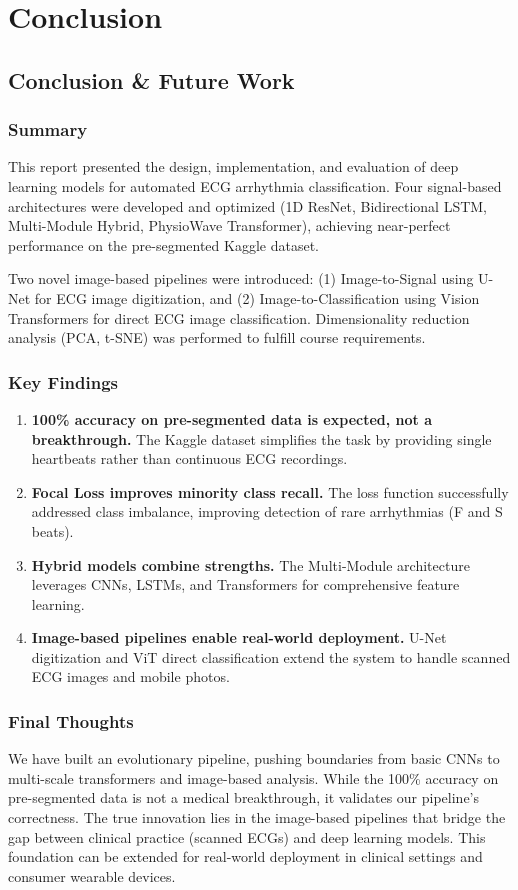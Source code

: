 \part{Conclusion}

\chapter{Conclusion \& Future Work}
\label{chap:conclusion}

\section{Summary}
This report presented the design, implementation, and evaluation of deep learning models for automated ECG arrhythmia classification. Four signal-based architectures were developed and optimized (1D ResNet, Bidirectional LSTM, Multi-Module Hybrid, PhysioWave Transformer), achieving near-perfect performance on the pre-segmented Kaggle dataset.

Two novel image-based pipelines were introduced: (1) Image-to-Signal using U-Net for ECG image digitization, and (2) Image-to-Classification using Vision Transformers for direct ECG image classification. Dimensionality reduction analysis (PCA, t-SNE) was performed to fulfill course requirements.

\section{Key Findings}
\begin{enumerate}
    \item \textbf{100\% accuracy on pre-segmented data is expected, not a breakthrough.} The Kaggle dataset simplifies the task by providing single heartbeats rather than continuous ECG recordings.
    \item \textbf{Focal Loss improves minority class recall.} The loss function successfully addressed class imbalance, improving detection of rare arrhythmias (F and S beats).
    \item \textbf{Hybrid models combine strengths.} The Multi-Module architecture leverages CNNs, LSTMs, and Transformers for comprehensive feature learning.
    \item \textbf{Image-based pipelines enable real-world deployment.} U-Net digitization and ViT direct classification extend the system to handle scanned ECG images and mobile photos.
\end{enumerate}

\section{Final Thoughts}
We have built an evolutionary pipeline, pushing boundaries from basic CNNs to multi-scale transformers and image-based analysis. While the 100\% accuracy on pre-segmented data is not a medical breakthrough, it validates our pipeline's correctness. The true innovation lies in the image-based pipelines that bridge the gap between clinical practice (scanned ECGs) and deep learning models. This foundation can be extended for real-world deployment in clinical settings and consumer wearable devices.
